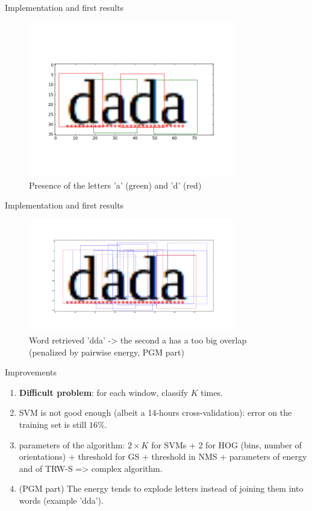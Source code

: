 \documentclass[handout]{beamer}
\begin{document}
\begin{frame}{Implementation and first results}
\begin{figure}%
\includegraphics[width=9cm]{figures/dada1.png}%
\caption{Presence of the letters 'a' (green) and 'd' (red)}%
\label{}%
\end{figure}
\end{frame}



\begin{frame}{Implementation and first results}
\begin{figure}%
\includegraphics[width=9cm]{figures/dada3.png}%
\caption{Word retrieved 'dda' -> the second a has a too big overlap (penalized by pairwise energy, PGM part)}%
\label{}%
\end{figure}
\end{frame}


\begin{frame}{Improvements}
\begin{enumerate}
	\item \textbf{Difficult problem}: for each window, classify $K$ times. 
	
	\item SVM is not good enough (albeit a 14-hours cross-validation): error on the training set is still $16\%$.
		
	\item parameters of the algorithm: $2\times K$ for SVMs + 2 for HOG (bins, number of orientations) + threshold for GS + threshold in NMS + parameters of energy and of TRW-S => complex algorithm.
	
	\item (PGM part) The energy tends to explode letters instead of joining them into words (example 'dda').
\end{enumerate}
\end{frame}
\end{document}
